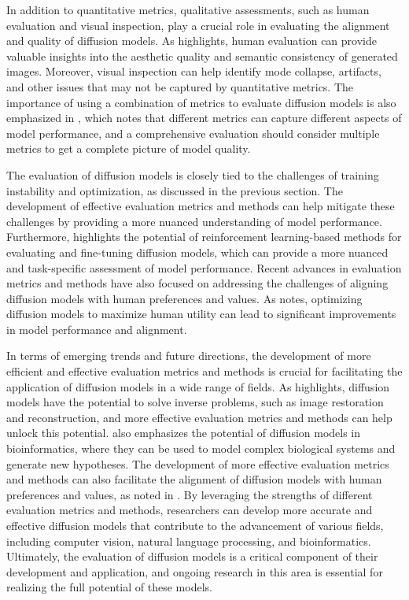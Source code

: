 \documentclass[11pt,a4paper]{article}
\begin{document}
In addition to quantitative metrics, qualitative assessments, such as human evaluation and visual inspection, play a crucial role in evaluating the alignment and quality of diffusion models. As \cite{doi:10.1109/tkde.2024.3361474} highlights, human evaluation can provide valuable insights into the aesthetic quality and semantic consistency of generated images. Moreover, visual inspection can help identify mode collapse, artifacts, and other issues that may not be captured by quantitative metrics. The importance of using a combination of metrics to evaluate diffusion models is also emphasized in \cite{arxiv:2502.06805}, which notes that different metrics can capture different aspects of model performance, and a comprehensive evaluation should consider multiple metrics to get a complete picture of model quality.

The evaluation of diffusion models is closely tied to the challenges of training instability and optimization, as discussed in the previous section. The development of effective evaluation metrics and methods can help mitigate these challenges by providing a more nuanced understanding of model performance. Furthermore, \cite{arxiv:2305.13301} highlights the potential of reinforcement learning-based methods for evaluating and fine-tuning diffusion models, which can provide a more nuanced and task-specific assessment of model performance. Recent advances in evaluation metrics and methods have also focused on addressing the challenges of aligning diffusion models with human preferences and values. As \cite{arxiv:2404.04465} notes, optimizing diffusion models to maximize human utility can lead to significant improvements in model performance and alignment.

In terms of emerging trends and future directions, the development of more efficient and effective evaluation metrics and methods is crucial for facilitating the application of diffusion models in a wide range of fields. As \cite{arxiv:2410.00083} highlights, diffusion models have the potential to solve inverse problems, such as image restoration and reconstruction, and more effective evaluation metrics and methods can help unlock this potential. \cite{arxiv:2302.10907} also emphasizes the potential of diffusion models in bioinformatics, where they can be used to model complex biological systems and generate new hypotheses. The development of more effective evaluation metrics and methods can also facilitate the alignment of diffusion models with human preferences and values, as noted in \cite{doi:10.1109/cvpr52734.2025.02198}. By leveraging the strengths of different evaluation metrics and methods, researchers can develop more accurate and effective diffusion models that contribute to the advancement of various fields, including computer vision, natural language processing, and bioinformatics. Ultimately, the evaluation of diffusion models is a critical component of their development and application, and ongoing research in this area is essential for realizing the full potential of these models.
\end{document}
